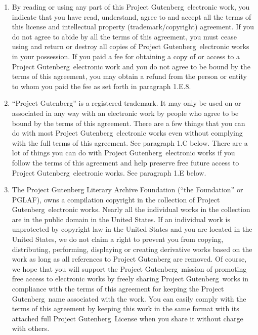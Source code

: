 \documentclass[10pt,a4paper]{book}
\begin{document}
\begin{enumerate}[label=1.\Alph*., wide=0pt, leftmargin=*, align=left]
  \item By reading or using any part of this Project Gutenberg\texttrademark\ electronic work, you indicate that you have read, understand, agree to and accept all the terms of this license and intellectual property (trademark/copyright) agreement. If you do not agree to abide by all the terms of this agreement, you must cease using and return or destroy all copies of Project Gutenberg\texttrademark\ electronic works in your possession. If you paid a fee for obtaining a copy of or access to a Project Gutenberg\texttrademark\ electronic work and you do not agree to be bound by the terms of this agreement, you may obtain a refund from the person or entity to whom you paid the fee as set forth in paragraph 1.E.8.

  \item “Project Gutenberg” is a registered trademark. It may only be used on or associated in any way with an electronic work by people who agree to be bound by the terms of this agreement. There are a few things that you can do with most Project Gutenberg\texttrademark\ electronic works even without complying with the full terms of this agreement. See paragraph 1.C below. There are a lot of things you can do with Project Gutenberg\texttrademark\ electronic works if you follow the terms of this agreement and help preserve free future access to Project Gutenberg\texttrademark\ electronic works. See paragraph 1.E below.

  \item The Project Gutenberg Literary Archive Foundation (“the Foundation” or PGLAF), owns a compilation copyright in the collection of Project Gutenberg\texttrademark\ electronic works. Nearly all the individual works in the collection are in the public domain in the United States. If an individual work is unprotected by copyright law in the United States and you are located in the United States, we do not claim a right to prevent you from copying, distributing, performing, displaying or creating derivative works based on the work as long as all references to Project Gutenberg are removed. Of course, we hope that you will support the Project Gutenberg\texttrademark\ mission of promoting free access to electronic works by freely sharing Project Gutenberg\texttrademark\ works in compliance with the terms of this agreement for keeping the Project Gutenberg\texttrademark\ name associated with the work. You can easily comply with the terms of this agreement by keeping this work in the same format with its attached full Project Gutenberg\texttrademark\ License when you share it without charge with others.


\end{enumerate}
\end{document}
